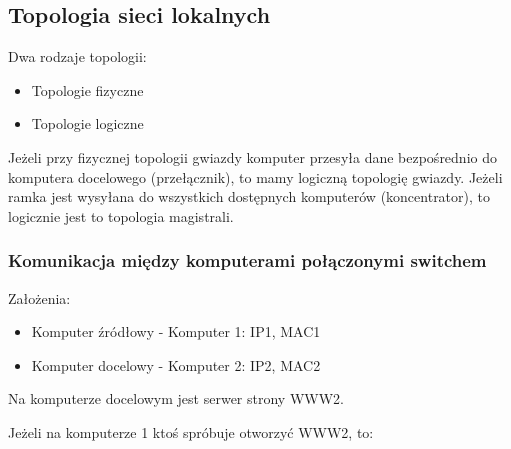 \documentclass[a4paper]{article}
\begin{document}
\subsection{Topologia sieci lokalnych}
Dwa rodzaje topologii:
\begin{itemize}
    \item Topologie fizyczne
    \item Topologie logiczne
\end{itemize}

Jeżeli przy fizycznej topologii gwiazdy komputer przesyła dane bezpośrednio do komputera docelowego (przełącznik), to mamy logiczną topologię gwiazdy. Jeżeli ramka jest wysyłana do wszystkich dostępnych komputerów (koncentrator), to logicznie jest to topologia magistrali.

\subsubsection{Komunikacja między komputerami połączonymi switchem}

Założenia:
\begin{itemize}
    \item Komputer źródłowy - Komputer 1: IP1, MAC1
    \item Komputer docelowy - Komputer 2: IP2, MAC2
\end{itemize}

Na komputerze docelowym  jest serwer strony WWW2.

Jeżeli na komputerze 1 ktoś spróbuje otworzyć WWW2, to:
\end{document}
